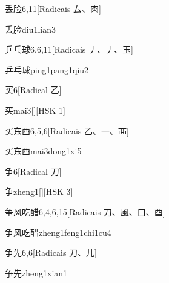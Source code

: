 \begin{entry}{丢脸}{6,11}[Radicais ⼛、⾁]
  \begin{phonetics}{丢脸}{diu1lian3}
  \end{phonetics}
\end{entry}

\begin{entry}{乒乓球}{6,6,11}[Radicais ⼃、⼃、⽟]
  \begin{phonetics}{乒乓球}{ping1pang1qiu2}
  \end{phonetics}
\end{entry}

\begin{entry}{买}{6}[Radical ⼄]
  \begin{phonetics}{买}{mai3}[][HSK 1]
  \end{phonetics}
\end{entry}

\begin{entry}{买东西}{6,5,6}[Radicais ⼄、⼀、⾑]
  \begin{phonetics}{买东西}{mai3dong1xi5}
  \end{phonetics}
\end{entry}

\begin{entry}{争}{6}[Radical ⼑]
  \begin{phonetics}{争}{zheng1}[][HSK 3]
  \end{phonetics}
\end{entry}

\begin{entry}{争风吃醋}{6,4,6,15}[Radicais ⼑、⾵、⼝、⾣]
  \begin{phonetics}{争风吃醋}{zheng1feng1chi1cu4}
  \end{phonetics}
\end{entry}

\begin{entry}{争先}{6,6}[Radicais ⼑、⼉]
  \begin{phonetics}{争先}{zheng1xian1}
  \end{phonetics}
\end{entry}

